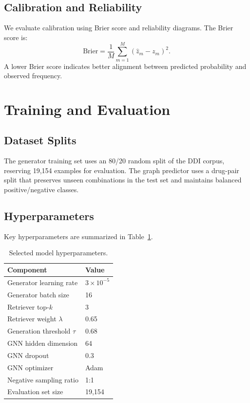 \documentclass[conference]{IEEEtran}
\begin{document}
\subsection{Calibration and Reliability}
We evaluate calibration using Brier score and reliability diagrams. The Brier score is:
\begin{equation}
    \mathrm{Brier} = \frac{1}{M} \sum_{m=1}^{M} (\hat{z}_m - z_m)^2.
\end{equation}
A lower Brier score indicates better alignment between predicted probability and observed frequency.

\section{Training and Evaluation}
\subsection{Dataset Splits}
The generator training set uses an 80/20 random split of the DDI corpus, reserving 19,154 examples for evaluation. The graph predictor uses a drug-pair split that preserves unseen combinations in the test set and maintains balanced positive/negative classes.

\subsection{Hyperparameters}
Key hyperparameters are summarized in Table~\ref{tab:hyperparameters}.

\begin{table}[t]
    \centering
    \caption{Selected model hyperparameters.}
    \label{tab:hyperparameters}
    \begin{tabular}{@{}ll@{}}
    \toprule
    Component & Value \\
    \midrule
    Generator learning rate & $3\times 10^{-5}$ \\
    Generator batch size & 16 \\
    Retriever top-$k$ & 3 \\
    Retriever weight $\lambda$ & 0.65 \\
    Generation threshold $\tau$ & 0.68 \\
    GNN hidden dimension & 64 \\
    GNN dropout & 0.3 \\
    GNN optimizer & Adam \\
    Negative sampling ratio & 1:1 \\
    Evaluation set size & 19,154 \\
    \bottomrule
    \end{tabular}
\end{table}
\end{document}
